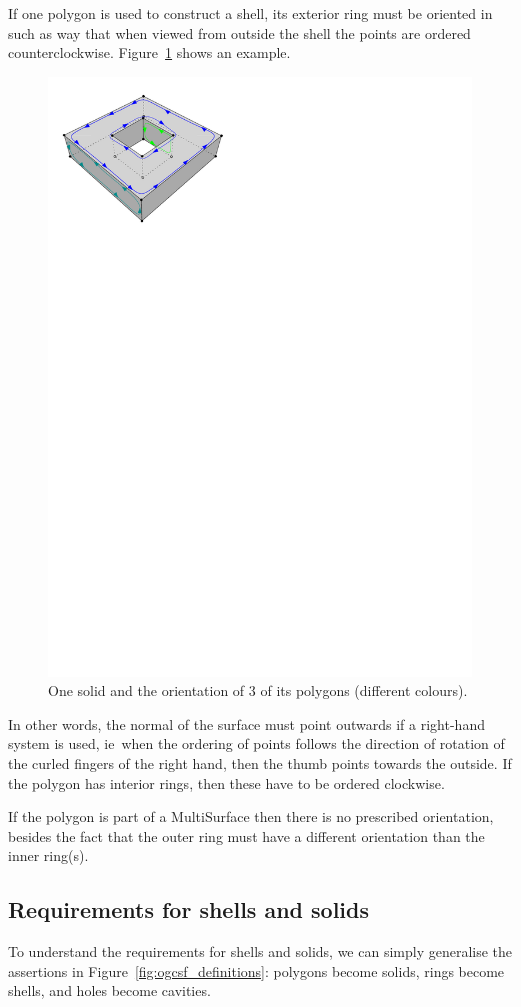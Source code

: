 \documentclass[a4paper,parskip=half,11pt]{scrartcl}
\newcommand{\ie}{ie}
\begin{document}
If one polygon is used to construct a shell, its exterior ring must be oriented in such as way that when viewed from outside the shell the points are ordered counterclockwise.
Figure~\ref{fig:orientation} shows an example.
\begin{figure}
  \centering
  \includegraphics[width=0.5\linewidth]{figs/orientation.pdf}
  \caption{One solid and the orientation of 3 of its polygons (different colours).}
\label{fig:orientation}
\end{figure}
In other words, the normal of the surface must point outwards if a right-hand system is used, \ie\ when the ordering of points follows the direction of rotation of the curled fingers of the right hand, then the thumb points towards the outside.
If the polygon has interior rings, then these have to be ordered clockwise.

If the polygon is part of a MultiSurface then there is no prescribed orientation, besides the fact that the outer ring must have a different orientation than the inner ring(s).



\subsection{Requirements for shells and solids}

To understand the requirements for shells and solids, we can simply generalise the assertions in Figure~\ref{fig:ogcsf_definitions}: polygons become solids, rings become shells, and holes become cavities.
\end{document}
